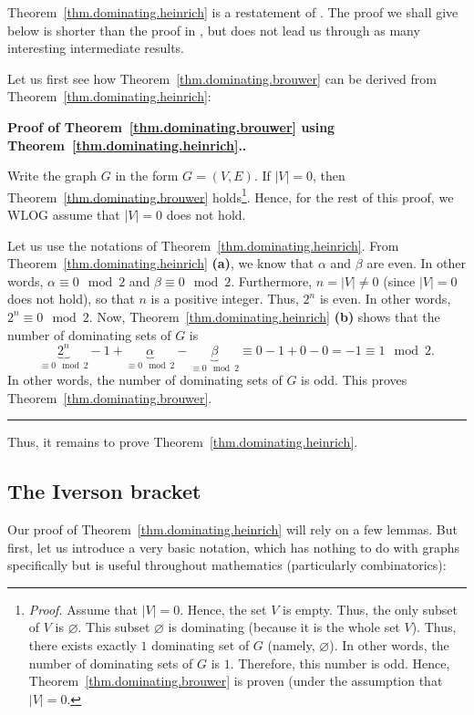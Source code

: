\documentclass[numbers=enddot,12pt,final,onecolumn,notitlepage]{scrartcl}%
\theoremstyle{definition}
\newenvironment{proof}[1][Proof]{\noindent\textbf{#1.} }{\ \rule{0.5em}{0.5em}}
\newcommand{\abs}[1]{\left| #1 \right|}
\newcommand{\tup}[1]{\left( #1 \right)}
\begin{document}
Theorem~\ref{thm.dominating.heinrich} is a restatement of
\cite[Theorem 8]{HeiTit17}. The proof we shall give below is
shorter than the proof in \cite{HeiTit17}, but does not lead us
through as many interesting intermediate results.

Let us first see how Theorem~\ref{thm.dominating.brouwer} can be
derived from Theorem~\ref{thm.dominating.heinrich}:

\begin{proof}[Proof of Theorem~\ref{thm.dominating.brouwer} using
Theorem~\ref{thm.dominating.heinrich}.]

Write the graph $G$ in the form $G = \tup{V, E}$. If $\abs{V} = 0$,
then Theorem~\ref{thm.dominating.brouwer}
holds\footnote{\textit{Proof.} Assume that $\abs{V} = 0$. Hence,
the set $V$ is empty. Thus, the only subset of $V$ is $\varnothing$.
This subset $\varnothing$ is dominating (because it is the whole
set $V$). Thus, there exists exactly $1$ dominating set of $G$
(namely, $\varnothing$). In other words, the number of dominating
sets of $G$ is $1$. Therefore, this number is odd. Hence,
Theorem~\ref{thm.dominating.brouwer} is proven (under the assumption
that $\abs{V} = 0$.}. Hence, for the rest of this proof, we
WLOG assume that $\abs{V} = 0$ does not hold.

Let us use the notations of Theorem~\ref{thm.dominating.heinrich}.
From Theorem~\ref{thm.dominating.heinrich} \textbf{(a)}, we know
that $\alpha$ and $\beta$ are even. In other words,
$\alpha \equiv 0 \mod 2$ and $\beta \equiv 0 \mod 2$.
Furthermore, $n = \abs{V} \neq 0$ (since $\abs{V} = 0$ does not
hold), so that $n$ is a positive integer. Thus, $2^n$ is even.
In other words, $2^n \equiv 0 \mod 2$. Now,
Theorem~\ref{thm.dominating.heinrich} \textbf{(b)} shows that
the number of dominating sets of $G$ is
\[
\underbrace{2^n}_{\equiv 0 \mod 2} - 1
  + \underbrace{\alpha}_{\equiv 0 \mod 2}
  - \underbrace{\beta}_{\equiv 0 \mod 2}
\equiv 0 - 1 + 0 - 0 = -1 \equiv 1 \mod 2.
\]
In other words, the number of dominating sets of $G$ is odd.
This proves Theorem~\ref{thm.dominating.brouwer}.
\end{proof}

Thus, it remains to prove Theorem~\ref{thm.dominating.heinrich}.

\subsection{\label{subsect.dominating.iverson}The Iverson bracket}

Our proof of Theorem~\ref{thm.dominating.heinrich} will rely on
a few lemmas. But first, let us introduce a very basic notation, which
has nothing to do with graphs specifically but is useful
throughout mathematics (particularly combinatorics):
\end{document}
